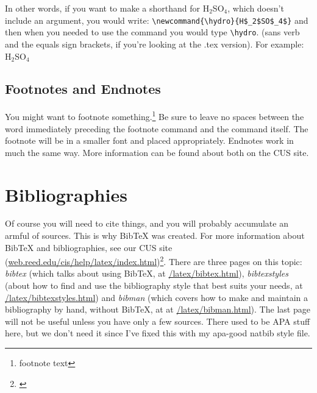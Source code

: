 \documentclass[12pt,twoside]{reedthesis}
\begin{document}
\newcommand{\hydro}{H$_2$SO$_4$}

In other words, if you want to make a shorthand for H$_2$SO$_4$, which doesn't include an argument, you would write: \verb=\newcommand{\hydro}{H$_2$SO$_4$}= and then when you needed  to use the command you would type \verb=\hydro=. (sans verb and the equals sign brackets, if you're looking at the .tex version). For example: \hydro

\subsection{Footnotes and Endnotes}
	You might want to footnote something.\footnote{footnote text} Be sure to leave no spaces between the word immediately preceding the footnote command and the command itself. The footnote will be in a smaller font and placed appropriately. Endnotes work in much the same way. More information can be found about both on the CUS site.
	
\section{Bibliographies}
	Of course you will need to cite things, and you will probably accumulate an armful of sources. This is why BibTeX was created. For more information about BibTeX and bibliographies, see our CUS site (\url{web.reed.edu/cis/help/latex/index.html})\footnote{\cite{reedweb:2007}}. There are three pages on this topic: {\it bibtex} (which talks about using BibTeX, at \url{/latex/bibtex.html}), {\it bibtexstyles} (about how to find and use the bibliography style that best suits your needs, at \url{/latex/bibtexstyles.html}) and {\it bibman} (which covers how to make and maintain a bibliography by hand, without BibTeX, at at \url{/latex/bibman.html}). The last page will not be useful unless you have only a few sources. There used to be APA stuff here, but we don't need it since I've fixed this with my apa-good natbib style file.
	
\end{document}
